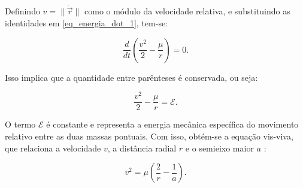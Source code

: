 Definindo $v = \|\dot{\vec{r}}\|$ como o módulo da velocidade relativa, e substituindo as identidades em \eqref{eq_energia_dot_1}, tem-se:

\begin{equation}
\frac{d}{dt}\left(\frac{v^2}{2}-\frac{\mu}{r}\right)=0.
\label{eq_energia_constante}
\end{equation}

Isso implica que a quantidade entre parênteses é conservada, ou seja:

\begin{equation}
\frac{v^2}{2}-\frac{\mu}{r}=\mathcal{E}.
\label{eq_energia_especifica}
\end{equation}

O termo $\mathcal{E}$ é constante e representa a energia mecânica específica do movimento relativo \cite{wie2008space} entre as duas massas pontuais.
Com isso, obtém-se a equação vis-viva, que relaciona a velocidade $v$, a distância radial $r$ e o semieixo maior $a$ \cite{wie2008space}:

\begin{equation}
\label{eq_vis_viva}
v^2 = \mu\left(\frac{2}{r}-\frac{1}{a}\right).
\end{equation}




